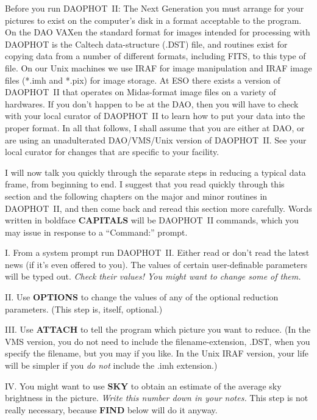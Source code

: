Before you run DAOPHOT~II: The Next Generation you must arrange for
your pictures to exist on the computer's disk in a format acceptable to
the program.  On the DAO VAXen the standard format for images intended
for processing with DAOPHOT is the Caltech data-structure (.DST) file,
and routines exist for copying data from a number of different formats,
including FITS, to this type of file. On our Unix machines we use IRAF
for image manipulation and IRAF image files (*.imh and *.pix) for image
storage. At ESO there exists a version of DAOPHOT~II that operates on
Midas-format image files on a variety of hardwares. If you don't happen
to be at the DAO, then you will have to check with your local curator
of DAOPHOT~II to learn how to put your data into the proper format. In
all that follows, I shall assume that you are either at DAO, or are
using an unadulterated DAO/VMS/Unix version of DAOPHOT~II.  See your
local curator for changes that are specific to your facility.

I will now talk you quickly through the separate steps in reducing
a typical data frame, from beginning to end.  I suggest that you read
quickly through this section and the following chapters on the major
and minor routines in DAOPHOT~II, and then come back and reread this
section more carefully.  Words written in boldface {\bf CAPITALS} will
be DAOPHOT~II commands, which you may issue in response to a
``Command:'' prompt.

\item{I.} From a system prompt run DAOPHOT~II. Either read or don't
read the latest news (if it's even offered to you).  The values of
certain user-definable parameters will be typed out.  {\it Check their
values!  You might want to change some of them.}

\item{II.} Use {\bf OPTIONS} to change the values of any of the
optional reduction parameters. (This step is, itself, optional.)

\item{III.} Use {\bf ATTACH}  to tell the program which picture you
want to reduce. (In the VMS version, you do not need to include the
filename-extension, .DST, when you specify the filename, but you may if
you like.  In the Unix IRAF version, your life will be simpler if you
{\it do not\/} include the .imh extension.)

\item{IV.} You might want to use {\bf SKY} to obtain an estimate of the
average sky brightness in the picture.  {\it Write this number down in
your notes.\/}  This step is not really necessary, because {\bf FIND}
below will do it anyway.

